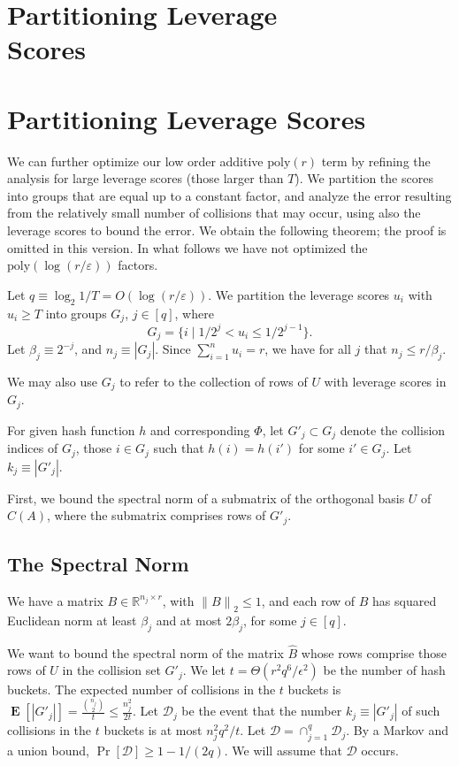 \documentclass{sig-alternate}
\newcommand{\norm}[1]{{\| #1 \|}}
\DeclareMathOperator{\E}{\mathbf{E}}
\newcommand{\poly}{{\mathrm{poly}}}
\newcommand{\eps}{\varepsilon}
\newcommand{\R}{{\mathbb R}}
\begin{document}
\ifSTOC
\section{Partitioning Leverage\\ Scores}\label{sec:partition}
\else
\section{Partitioning Leverage Scores}\label{sec:partition}
\fi
We can further optimize our low order additive $\poly(r)$ term by refining the analysis for large leverage scores (those larger than $T$). 
We partition the scores into groups that are equal up to a constant factor, and analyze the error resulting from the 
relatively small number of collisions that may occur, using also the leverage scores to bound the error.
\ifSTOC
We obtain the following theorem; the proof is omitted in this version.
\else
 In what follows we 
have not optimized the $\poly(\log(r/\eps))$ factors. 

Let $q \equiv \log_2 1/T = O(\log(r/\eps))$. 
We partition the leverage scores $u_i$ with $u_i \geq T$ into
groups $G_j$, $j \in [q]$, where
$$G_j = \{i \mid 1/2^j < u_i \leq 1/2^{j-1}\}.$$
Let $\beta_j \equiv 2^{-j}$, and $n_j\equiv |G_j|$.
Since $\sum_{i=1}^n u_i = r$, we have for all $j$ that $n_j \leq r/\beta_j$.

We may also use $G_j$ to refer to the collection of rows of $U$
with leverage scores in $G_j$.

For given hash function $h$ and corresponding $\Phi$,
let $G'_j\subset G_j$ denote the collision indices of $G_j$,
those $i\in G_j$ such that $h(i)=h(i')$ for some $i'\in G_j$.
Let $k_j\equiv |G'_j|$.

First, we bound the spectral norm of a submatrix of the orthogonal basis $U$ of $C(A)$,
where the submatrix comprises rows of $G'_j$.

\subsection{The Spectral Norm}\label{subsec:spectral}
We have a matrix $B\in \R^{n_j\times r}$, with $\norm{B}_2\le 1$, and
each row of $B$ has squared Euclidean norm at least $\beta_j$
and at most $2\beta_j$, for some $j\in [q]$.

We want to bound the spectral norm of the matrix $\hat B$ whose
rows comprise those rows of $U$ in the collision set $G'_j$.
We let $t = \Theta(r^2 q^6/\epsilon^2)$
be the number of hash buckets. 
The expected number of collisions in the $t$ buckets is
$\E[|G'_j|] = \frac{{n_j \choose 2}}{t} \leq \frac{n_j^2}{2t}.$
Let $\mathcal{D}_j$ be the event that the number $k_j \equiv |G'_j| $ of such collisions in the $t$ buckets is at most $n_j^2 q^2/t$.
Let $\mathcal{D} = \cap_{j=1}^q \mathcal{D}_j$. By a 
Markov and a union bound, $\Pr[\mathcal{D}] \ge 1-1/(2q)$. We will assume that $\mathcal{D}$
occurs.
\end{document}
